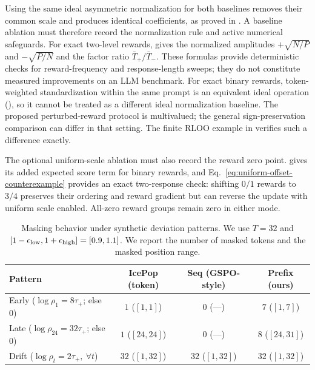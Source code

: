 Using the same ideal asymmetric normalization for both baselines removes
their common scale and produces identical coefficients, as proved in
. A baseline ablation must
therefore record the normalization rule and active numerical safeguards.
For exact two-level rewards,  gives
the normalized amplitudes $+\sqrt{N/P}$ and $-\sqrt{P/N}$ and the factor
ratio $\bar T_+/\bar T_-$. These formulas provide deterministic checks
for reward-frequency and response-length sweeps; they do not constitute
measured improvements on an LLM benchmark.
For exact binary rewards, token-weighted standardization within the same
prompt is an equivalent ideal operation
(), so it cannot be treated as a
different ideal normalization baseline. The proposed perturbed-reward
protocol is multivalued; the general sign-preservation comparison can differ
in that setting. The finite RLOO example in
 verifies such a difference exactly.

The optional uniform-scale ablation must also record the reward zero point.
 gives its added expected score term for
binary rewards, and Eq.~\eqref{eq:uniform-offset-counterexample} provides
an exact two-response check: shifting $0/1$ rewards to $3/4$ preserves
their ordering and reward gradient but can reverse the update with uniform
scale enabled. All-zero reward groups remain zero in either mode.

\begin{table}[ht]
\centering
\caption{Masking behavior under synthetic deviation patterns. We use $T=32$ and $[1-\epsilon_{\mathrm{low}},1+\epsilon_{\mathrm{high}}]=[0.9,1.1]$. We report the number of masked tokens and the masked position range.}
\renewcommand{\arraystretch}{1.2}
\begin{tabular}{lccc}
\toprule
\textbf{Pattern} & \textbf{IcePop (token)} & \textbf{Seq (GSPO-style)} & \textbf{Prefix (ours)} \\
\midrule
Early ($\log\rho_1{=}8\tau_+$; else $0$) & $1$ ($[1,1]$) & $0$ (---) & $7$ ($[1,7]$) \\
Late ($\log\rho_{24}{=}32\tau_+$; else $0$) & $1$ ($[24,24]$) & $0$ (---) & $8$ ($[24,31]$) \\
Drift ($\log\rho_t{=}2\tau_+,\ \forall t$) & $32$ ($[1,32]$) & $32$ ($[1,32]$) & $32$ ($[1,32]$) \\
\bottomrule
\end{tabular}
\end{table}

